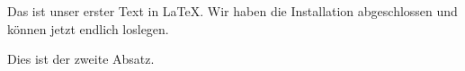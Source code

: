 \documentclass[a4paper,12pt]{scrartcl}
\begin{document}
Das ist unser erster Text in \LaTeX{}. Wir haben die Installation
abgeschlossen und können jetzt endlich loslegen.

Dies ist der zweite Absatz.
\end{document}
